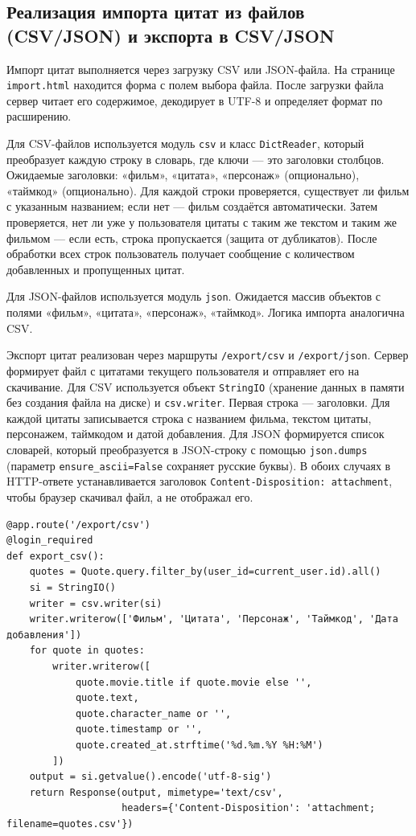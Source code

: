 \subsection{Реализация импорта цитат из файлов (CSV/JSON) и экспорта в CSV/JSON}

Импорт цитат выполняется через загрузку CSV или JSON-файла. На странице \texttt{import.html} 
находится форма с полем выбора файла. После загрузки файла сервер читает его содержимое, 
декодирует в UTF-8 и определяет формат по расширению.

Для CSV-файлов используется модуль \texttt{csv} и класс \texttt{DictReader}, который 
преобразует каждую строку в словарь, где ключи — это заголовки столбцов. Ожидаемые 
заголовки: «фильм», «цитата», «персонаж» (опционально), «таймкод» (опционально). Для 
каждой строки проверяется, существует ли фильм с указанным названием; если нет — фильм 
создаётся автоматически. Затем проверяется, нет ли уже у пользователя цитаты с таким же 
текстом и таким же фильмом — если есть, строка пропускается (защита от дубликатов). После 
обработки всех строк пользователь получает сообщение с количеством добавленных и пропущенных 
цитат.

Для JSON-файлов используется модуль \texttt{json}. Ожидается массив объектов с полями 
«фильм», «цитата», «персонаж», «таймкод». Логика импорта аналогична CSV.

Экспорт цитат реализован через маршруты \texttt{/export/csv} и \texttt{/export/json}. 
Сервер формирует файл с цитатами текущего пользователя и отправляет его на скачивание. 
Для CSV используется объект \texttt{StringIO} (хранение данных в памяти без создания файла 
на диске) и \texttt{csv.writer}. Первая строка — заголовки. Для каждой цитаты записывается 
строка с названием фильма, текстом цитаты, персонажем, таймкодом и датой добавления. Для 
JSON формируется список словарей, который преобразуется в JSON-строку с помощью 
\texttt{json.dumps} (параметр \texttt{ensure\_ascii=False} сохраняет русские буквы). 
В обоих случаях в HTTP-ответе устанавливается заголовок \texttt{Content-Disposition: 
attachment}, чтобы браузер скачивал файл, а не отображал его.

\begin{lstlisting}[caption={Экспорт цитат в CSV (app.py)}, label={lst:export_csv}]
@app.route('/export/csv')
@login_required
def export_csv():
    quotes = Quote.query.filter_by(user_id=current_user.id).all()
    si = StringIO()
    writer = csv.writer(si)
    writer.writerow(['Фильм', 'Цитата', 'Персонаж', 'Таймкод', 'Дата добавления'])
    for quote in quotes:
        writer.writerow([
            quote.movie.title if quote.movie else '',
            quote.text,
            quote.character_name or '',
            quote.timestamp or '',
            quote.created_at.strftime('%d.%m.%Y %H:%M')
        ])
    output = si.getvalue().encode('utf-8-sig')
    return Response(output, mimetype='text/csv',
                    headers={'Content-Disposition': 'attachment; filename=quotes.csv'})
\end{lstlisting}
